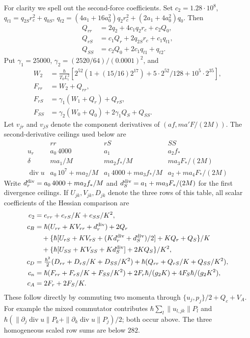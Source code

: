\documentclass[11pt]{article}
\theoremstyle{definition}\newtheorem{definition}[theorem]{Definition}
\theoremstyle{remark}\newtheorem{remark}[theorem]{Remark}
\begin{document}
For clarity we spell out the second-force coefficients. Set
$c_2=1.28\cdot10^8$, $q_{t1}=q_{2S}r_c^2+q_{0S}$,
$q_{t2}=(4a_1+16a_0^2)q_2r_c^2+(2a_1+4a_0^2)q_0$. Then
\begin{align*}
 Q_{rr}&=2q_2+4c_1q_2r_c+c_2Q_0,\\
 Q_{rS}&=c_1Q_r+2q_{2S}r_c+c_1q_{t1},\\
 Q_{SS}&=c_2Q_0+2c_1q_{t1}+q_{t2}.
\end{align*}
Put $\gamma_1=25000$,
$\gamma_2=(2520/64)/(0.0001)^2$, and
\begin{align*}
 W_2&=\frac{\hbar}{T_0L_i^2}
 [2^{52}(1+(15/16)2^{17})+5\cdot2^{52}/128+10^5\cdot2^{35}],\\
 F_{rr}&=W_2+Q_{rr},\\
 F_{rS}&=\gamma_1(W_1+Q_r)+Q_{rS},\\
 F_{SS}&=\gamma_2(W_0+Q_0)+2\gamma_1Q_S+Q_{SS}.
\end{align*}
Let $v_{jr}$ and $v_{jS}$ denote the component derivatives of
$(af,ma'F/(2M))$. The second-derivative ceilings used below are
\[
\begin{array}{c|ccc}
 &rr&rS&SS\\\hline
 u_r&a_0\,4000&a_1&a_2f_*\\
 \delta&ma_1/M&ma_2f_*/M&ma_3F_*/(2M)\\
 \operatorname{div}u&a_0\,10^7+ma_2/M&
 a_1\,4000+ma_3f_*/M&a_2+ma_4F_*/(2M)
\end{array}
\]
Write $d^{\rm div}_r=a_0\,4000+ma_2f_*/M$ and
$d^{\rm div}_S=a_1+ma_3F_*/(2M)$ for the first divergence
ceilings. If $U_{jk},V_{jk},D_{jk}$ denote the three rows of this table,
all scalar coefficients of the Hessian comparison are
\begin{align*}
 e_2&=e_{rr}+e_{rS}/K+e_{SS}/K^2,\\
 c_B&=\hbar(U_{rr}+KV_{rr}+d^{\rm div}_r)+2Q_r\\
 &\quad+\{\hbar[U_{rS}+KV_{rS}+(Kd^{\rm div}_r+d^{\rm div}_S)/2]
                  +KQ_r+Q_S\}/K\\
 &\quad+\{\hbar[U_{SS}+KV_{SS}+Kd^{\rm div}_S]+2KQ_S\}/K^2,\\
 c_D&=\tfrac{\hbar^2}{2}(D_{rr}+D_{rS}/K+D_{SS}/K^2)
                  +\hbar(Q_{rr}+Q_{rS}/K+Q_{SS}/K^2),\\
 c_n&=\hbar(F_{rr}+F_{rS}/K+F_{SS}/K^2)
                  +2F_r\hbar/(g_2K)+4F_S\hbar/(g_2K^2),\\
 c_A&=2F_r+2F_S/K.
\end{align*}
These follow directly by commuting two momenta through
$\{u_j,p_j\}/2+Q_c+V_A$. For example the mixed commutator contributes
$\hbar\sum_l\|u_{l,jk}\|P_l$ and
$\hbar(\|\partial_j\operatorname{div}u\|P_k+
\|\partial_k\operatorname{div}u\|P_j)/2$; both occur above.
The three homogeneous scaled row sums are below $282$.
\end{document}
